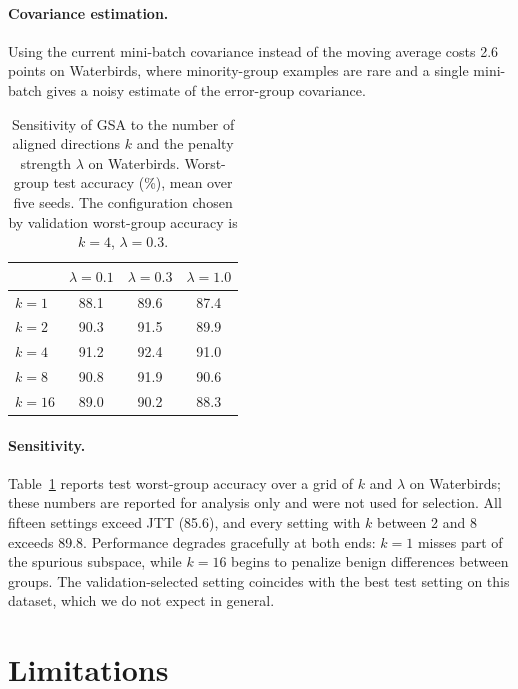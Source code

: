 \documentclass{article}
\begin{document}
\paragraph{Covariance estimation.}
Using the current mini-batch covariance instead of the moving average costs 2.6 points on Waterbirds, where minority-group examples are rare and a single mini-batch gives a noisy estimate of the error-group covariance.

\begin{table}[t]
\centering
\caption{Sensitivity of GSA to the number of aligned directions $k$ and the penalty strength $\lambda$ on Waterbirds. Worst-group test accuracy (\%), mean over five seeds. The configuration chosen by validation worst-group accuracy is $k = 4$, $\lambda = 0.3$.}
\label{tab:sensitivity}
\small
\begin{tabular}{lccc}
\toprule
 & $\lambda = 0.1$ & $\lambda = 0.3$ & $\lambda = 1.0$ \\
\midrule
$k = 1$ & 88.1 & 89.6 & 87.4 \\
$k = 2$ & 90.3 & 91.5 & 89.9 \\
$k = 4$ & 91.2 & 92.4 & 91.0 \\
$k = 8$ & 90.8 & 91.9 & 90.6 \\
$k = 16$ & 89.0 & 90.2 & 88.3 \\
\bottomrule
\end{tabular}
\end{table}

\paragraph{Sensitivity.}
Table~\ref{tab:sensitivity} reports test worst-group accuracy over a grid of $k$ and $\lambda$ on Waterbirds; these numbers are reported for analysis only and were not used for selection. All fifteen settings exceed JTT (85.6), and every setting with $k$ between 2 and 8 exceeds 89.8. Performance degrades gracefully at both ends: $k = 1$ misses part of the spurious subspace, while $k = 16$ begins to penalize benign differences between groups. The validation-selected setting coincides with the best test setting on this dataset, which we do not expect in general.

\section{Limitations}
\label{sec:limitations}
\end{document}
